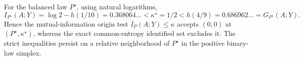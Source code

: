 For the balanced law \(P^\star\), using natural logarithms, \[I_{P^\star}(A;Y)=\log2-h(1/10)=0.368064\ldots<\kappa^\star=1/2<h(4/9)=0.686962\ldots=G_{P^\star}(A;Y).\] Hence the mutual-information origin test \(I_P(A;Y)\leq\kappa\) accepts \((0,0)\) at \((P^\star,\kappa^\star)\), whereas the exact common-entropy identified set excludes it. The strict inequalities persist on a relative neighborhood of \(P^\star\) in the positive binary-law simplex.